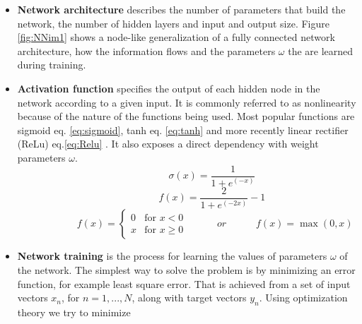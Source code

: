 \begin{itemize}
\item \textbf{Network architecture} describes the number of parameters that build the network, the number of hidden layers and input and output size. Figure \ref{fig:NNim1} shows a node-like generalization of a  fully connected network architecture, how the information flows and the parameters $\omega$ the are learned during training.  
\item \textbf{Activation function} specifies the output of each hidden node in the network according to a given input. It is commonly referred to as nonlinearity because of the nature of the functions being used. Most popular functions are sigmoid eq. \ref{eq:sigmoid}, tanh eq. \ref{eq:tanh} and more recently linear rectifier (ReLu) eq.\ref{eq:Relu} \cite{glorot2011deep}. It also exposes a direct dependency with weight parameters $\omega$. 
\begin{equation} \label{eq:sigmoid}
\hspace{3em} \hspace{3em} \hspace{3em} \sigma (x) = \frac{1}{1+e^{(-x)}} \enspace \enspace \hspace{3em}
\end{equation} 
\begin{equation} \label{eq:tanh}
\hspace{3em} \hspace{3em} \hspace{3em} f (x) = \frac{2}{1+e^{(-2x)}}-1 \enspace \enspace \hspace{3em}
\end{equation} 
\begin{equation} \label{eq:Relu}
\hspace{3em} \hspace{3em} f (x) = \begin{cases} 0 & \text{for } x < 0 \\ x & \text{for } x \geqslant 0    \end{cases} \hspace{3em} or \hspace{3em} f (x) = \max (0,x) \hspace{3em}
\end{equation} 
\item \textbf{Network training} is the process for learning the values of parameters $\omega$ of the network. The simplest way to solve the problem is by minimizing an error function, for example least square error. That is achieved from a set of input vectors $x_n$, for $n = 1,...,N$, along with target vectors $y_n$. Using optimization theory we try to minimize 

\end{itemize}
